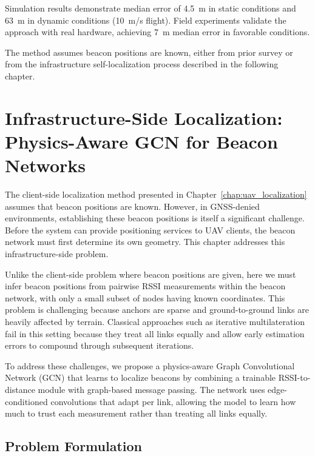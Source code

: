 \documentclass[master,final,11pt]{iscs-thesis}
\begin{document}
Simulation results demonstrate median error of 4.5~m in static conditions and 63~m in dynamic conditions (10~m/s flight).
Field experiments validate the approach with real hardware, achieving 7~m median error in favorable conditions.

The method assumes beacon positions are known, either from prior survey or from the infrastructure self-localization process described in the following chapter.

\chapter{Infrastructure-Side Localization: Physics-Aware GCN for Beacon Networks}
\label{chap:infrastructure}

The client-side localization method presented in Chapter~\ref{chap:uav_localization} assumes that beacon positions are known.
However, in GNSS-denied environments, establishing these beacon positions is itself a significant challenge.
Before the system can provide positioning services to UAV clients, the beacon network must first determine its own geometry.
This chapter addresses this infrastructure-side problem.

Unlike the client-side problem where beacon positions are given, here we must infer beacon positions from pairwise RSSI measurements within the beacon network, with only a small subset of nodes having known coordinates.
This problem is challenging because anchors are sparse and ground-to-ground links are heavily affected by terrain.
Classical approaches such as iterative multilateration fail in this setting because they treat all links equally and allow early estimation errors to compound through subsequent iterations.

To address these challenges, we propose a physics-aware Graph Convolutional Network (GCN) that learns to localize beacons by combining a trainable RSSI-to-distance module with graph-based message passing.
The network uses edge-conditioned convolutions that adapt per link, allowing the model to learn how much to trust each measurement rather than treating all links equally.

\section{Problem Formulation}
\label{sec:infra_problem}
\end{document}
